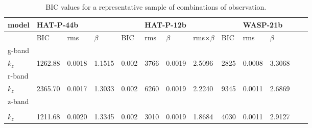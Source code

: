 \begin{table}
\centering
\caption{BIC values for a representative sample of combinations of observation.}
\label{tab:bic}
\begin{tabular}{lllllllllllll}
model  & \multicolumn{4}{l}{HAT-P-44b}          & \multicolumn{4}{l}{HAT-P-12b}          & \multicolumn{4}{l}{WASP-21b}           \\ \hline
       & BIC & rms & $\beta$ & BIC & rms & $\beta$ & rms$\times\beta$ & BIC & rms & $\beta$ \\
g-band & \multicolumn{12}{l}{}                                                                                                    \\
$k_z$  & 1262.88    & 0.0018    & 1.1515       &   0.002   & 3766    & 0.0019    & 2.5096        &  2825   & 0.0008     & 3.3068                   \\ \hline
r-band & \multicolumn{12}{l}{}                                                                                                    \\
$k_z$  & 2365.70    & 0.0017    & 1.3033       &  0.002    & 6260    & 0.0019    & 2.2240        & 9345    & 0.0011    &  2.6869                   \\ \hline
z-band & \multicolumn{12}{l}{}                                                                                                    \\
       &     &     &         &                 &     &     &         &                  &     &     &         &    \\
$k_z$  & 1211.68    & 0.0020    & 1.3345       &   0.002   & 3010    & 0.0019  &  1.8684       & 4030    &  0.0011   & 2.9127                     \\ \hline
\end{tabular}
\end{table}
                              


